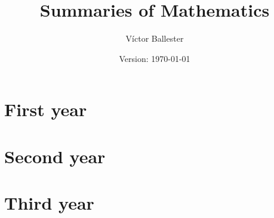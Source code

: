 \documentclass[10pt,a4paper]{report}
\title{Summaries of Mathematics}
\author{Víctor Ballester}
\date{Version: \today}
\begin{document}
\maketitle
\newpage
\tableofcontents
\newpage
\chapter{First year}
\newpage

\cleardoublepage


\cleardoublepage


\cleardoublepage


\chapter{Second year}
\newpage

\cleardoublepage


\cleardoublepage


\cleardoublepage


\cleardoublepage


\cleardoublepage


\cleardoublepage


\chapter{Third year}
\newpage

\cleardoublepage


\cleardoublepage


\cleardoublepage


\cleardoublepage


\cleardoublepage


\cleardoublepage
\end{document}

